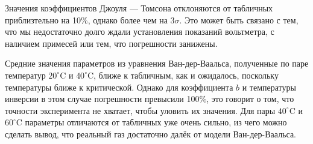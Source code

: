 \documentclass[12pt]{article}
\begin{document}
	Значения коэффициентов Джоуля --- Томсона отклоняются от табличных приблизтельно на 10\%, однако более чем на $3 \sigma$. Это может быть связано с тем, что мы недостаточно долго ждали установления показаний вольтметра, с наличием примесей или тем, что погрешности занижены.
	
	Средние значения параметров из уравнения Ван-дер-Ваальса, полученные по паре температур $20 ^\circ\text{C}$ и $40 ^\circ\text{C}$, ближе к табличным, как и ожидалось, поскольку температуры ближе к критической. Однако для коэффициента $b$ и температуры инверсии в этом случае погрешности превысили 100\%, это говорит о том, что точности эксперимента не хватает, чтобы уловить их значения. Для пары $40 ^\circ\text{C}$ и $60 ^\circ\text{C}$ параметры отличаются от табличных уже очень сильно, из чего можно сделать вывод, что реальный газ достаточно далёк от модели Ван-дер-Ваальса.
	
\end{document}
